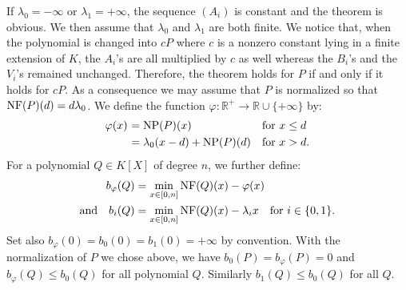 \documentclass{sig-alternate-2013}
\DeclareMathOperator{\NP}{NP}
\newcommand{\slp}{\text{\rm slp}}
\newcommand{\R}{\mathbb R}
\newcommand{\NF}{\text{\rm NF}}
\begin{document}
\begin{comment}
This is enough to conclude on the Newton polygon of $R_{i+1}.$
Indeed, thanks to \eqref{eq:Riplus}, we obtain that 
\[\NP (R_i) \geq -\lambda_0+2^i(\lambda_1-\lambda_0)+(d-1) \slp (\lambda_0). \]
We can proceed similarly for $1-V_{i+1} B_{i+1}$ using \eqref{eq:ViBiplus}.

Finally, we can apply \eqref{eqdef:Si2} for $i+1,$
\begin{align*}
S_{i+1} & = (B_{i+1} R_{i+1} + (1-V_{i+1} B_{i+1}) S_{i} \\
& + (1-V_{i+1} B_{i+1})(S_{i+1}-S_{i})) \% A_{i+1},
\end{align*}
to obtain the desired minoration on $\NP (S_{i+1}).$ This concludes the proof.
\end{proof}

\subsubsection{Xavier's proof}
\end{comment}

If $\lambda_0 = -\infty$ or $\lambda_1 = +\infty$, the sequence $(A_i)$
is constant and the theorem is obvious. We then assume that $\lambda_0$
and $\lambda_1$ are both finite.
We notice that, when the polynomial is changed into $cP$ where $c$ is a 
nonzero constant lying in a finite extension of $K$, the $A_i$'s are all 
multiplied by $c$ as well whereas the $B_i$'s and the $V_i$'s remained 
unchanged. Therefore, the theorem holds for $P$ if and only if it holds 
for $cP$. As a consequence we may assume that $P$ is normalized so that 
$\NF(P)(d) = d \lambda_0$. We define the function $\varphi : \R^+ \to \R 
\cup \{+\infty\}$ by:
\begin{equation}
\label{eqdef:functionphi}
\begin{array}{r@{\,\,}ll}
\varphi(x) & = \NP(P)(x) & \text{for } x \leq d \smallskip \\
& = \lambda_0 (x-d) + \NP(P)(d) & \text{for } x > d.
\end{array}
\end{equation}
For a polynomial $Q \in K[X]$ of degree $n$, we further define:
\begin{align}
b_\varphi(Q) & = \min_{x \in [0,n]} \NF(Q)(x) - \varphi(x) 
\label{eqdef:bphi} \\
\text{and} \quad
b_i(Q) & = \min_{x \in [0,n]} \NF(Q)(x) - \lambda_i x
\quad \text{for } i \in \{0,1\}.
\label{eqdef:b0}
\end{align}
Set also $b_\varphi(0) = b_0(0) = b_1(0) = +\infty$ by convention.
With the normalization of $P$ we chose above, we have $b_0(P)
= b_\varphi(P) = 0$ and $b_\varphi(Q) \leq b_0(Q)$ for all polynomial
$Q$. Similarly $b_1(Q) \leq b_0(Q)$ for all $Q$.
\end{document}
